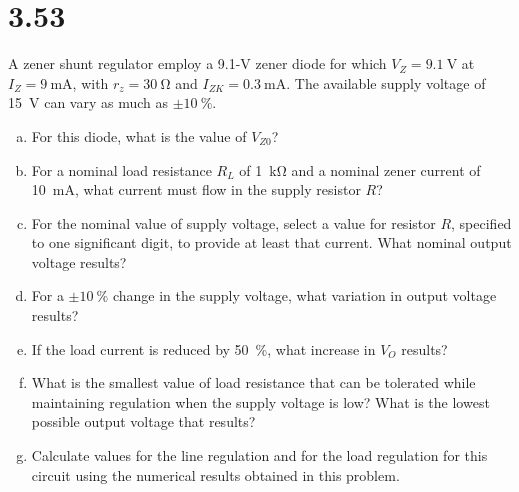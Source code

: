 \documentclass[12pt, a4paper]{article}
\begin{document}
\section{3.53}
A zener shunt regulator employ a 9.1-\si{\V} zener diode for which
$V_Z = \SI{9.1}{\V}$ at $I_Z = \SI{9}{\mA}$, with $r_z = \SI{30}{\ohm}$
and $I_{ZK}=\SI{0.3}{\mA}$. The available supply voltage of \SI{15}{\V}
can vary as much as $\pm\SI{10}{\percent}$.
\begin{enumerate}[(a)]
  \item For this diode, what is the value of $V_{Z0}$?
  \item For a nominal load resistance $R_L$ of \SI{1}{\kohm}
and a nominal zener current of \SI{10}{\mA}, what current must flow
in the supply resistor $R$?
  \item For the nominal value of supply voltage, select a value for resistor $R$, specified to one significant digit, to provide at least that current. What nominal output voltage results?
  \item For a $\pm\SI{10}{\percent}$ change in the supply voltage, what variation
in output voltage results?
  \item If the load current is reduced by
\SI{50}{\percent}, what increase in $V_O$ results?
  \item What is the smallest value of load resistance that can be tolerated while maintaining
regulation when the supply voltage is low?  What is the lowest possible output voltage that results? 
  \item Calculate values for the line regulation
and for the load regulation for this circuit using the numerical results
obtained in this problem.
\end{enumerate}
\end{document}
